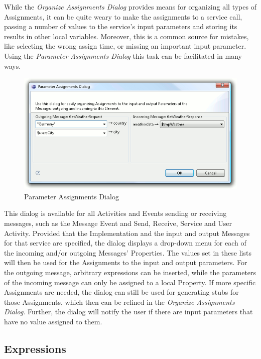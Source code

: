 While the \emph{Organize Assignments Dialog} provides means for organizing all
types of Assignments, it can be quite weary to make the assignments to a service
call, passing a number of values to the service's input parameters and storing
its results in other local variables.  Moreover, this is a common source for
mistakes, like selecting the wrong assign time, or missing an important input
parameter.  Using the \emph{Parameter Assignments Dialog} this task can be
facilitated in many ways.

\begin{figure}[ht]
	\centering
	\includegraphics[width=.6\textwidth]{figures/features/paramAssign.png}
	\caption{Parameter Assignments Dialog}
	\label{fig:paramAssign}
\end{figure}

This dialog is available for all Activities and Events sending or receiving
messages, such as the Message Event and Send, Receive, Service and User Activity.
Provided that the Implementation and the input and output Messages for that
service are specified, the dialog displays a drop-down menu for each of the
incoming and/or outgoing Messages' Properties.  The values set in these lists
will then be used for the Assignments to the input and output parameters.  For
the outgoing message, arbitrary expressions can be inserted, while the parameters
of the incoming message can only be assigned to a local Property.  If more specific
Assignments are needed, the dialog can still be used for generating stubs for
those Assignments, which then can be refined in the \emph{Organize Assignments
Dialog}.  Further, the dialog will notify the user if there are input parameters
that have no value assigned to them.



\subsection{Expressions}
\label{sec:user_features_exp}

